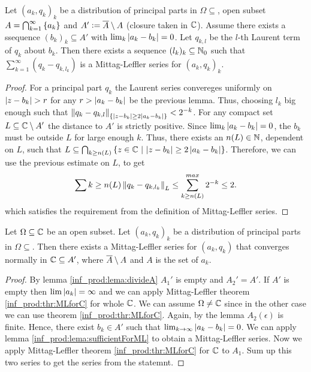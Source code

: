 \begin{lema}
    \label{inf_prod:lema:sufficientForML}
    Let $(a_k, q_k)_k$ be a distribution of principal parts in $\Omega \subseteq$, open subset $A = \bigcap_{k = 1}^{\infty} \left\{a_k\right\}$ and $A' \vcentcolon= \overline{A} \setminus A$ (closure taken in $\mathbb{C}$). Assume there exists a ssequence $(b_k)_k \subseteq A'$ with $\lim_k \left\lvert a_k - b_k\right\rvert = 0$. Let $q_{k, l}$ be the $l$-th Laurent term of $q_k$ about $b_k$. Then there exists a sequence $(l_k)_k \subseteq \mathbb{N}_0$ such that $\sum_{k = 1}^{\infty}(q_k - q_{k, l_k})$ is a Mittag-Leffler series for $(a_k, q_k)_k$.
\end{lema}
\begin{proof}
    For a principal part $q_k$ the Laurent series convereges uniformly on $\left\lvert z - b_k\right\rvert > r$ for any $r > \left\lvert a_k - b_k\right\rvert$ be the previous lemma. Thus, choosing $l_k$ big enough such that $\left\lVert q_k - q_{k, l}\right\rVert_{\left\{\left\lvert z - b_k\right\rvert \geq 2 \left\lvert a_k - b_k\right\rvert\right\}} < 2^{-k}$.
    For any compact set $L \subseteq \mathbb{C} \setminus A'$ the distance to $A'$ is strictly positive. Since $\lim_k \left\lvert a_k - b_k\right\rvert = 0$, the $b_k$ must be outside $L$ for large enough $k$. Thus, there exists an $n(L) \in \mathbb{N}$, dependent on $L$, such that $L \subseteq \bigcap_{k \geq n(L)} \left\{z \in \mathbb{C}~\middle\vert~\left\lvert z - b_k\right\rvert \geq 2 \left\lvert a_k - b_k\right\rvert\right\}$. Therefore, we can use the previous estimate on $L$, to get 
    $$
        \sum{k \geq n(L)} \left\lVert q_k - q_{k, l_k}\right\rVert_L \leq \sum_{k \geq n(L)}^{max} 2^{- k} \leq 2.
    $$
    which satisfies the requirement from the definition of Mittag-Leffler series.
\end{proof}

\begin{izrek}
    \label{inf_prod:lema:MLTOpen}
    Let $\Omega \subseteq \mathbb{C}$ be an open subset. Let $(a_k, q_k)_k$ be a distribution of principal parts in $\Omega \subseteq$. Then there exists a Mittag-Leffler series for $(a_k, q_k)$ that converges normally in $\mathbb{C} \subseteq A'$, where $\overline{A} \setminus A$ and $A$ is the set of $a_k$.
\end{izrek}
\begin{proof}
    By lemma \ref{inf_prod:lema:divideA} $A_1'$ is empty and $A_2' = A'$. If $A'$ is empty then $\lim \left\lvert a_k\right\rvert = \infty$ and we can apply Mittag-Leffler theorem \ref{inf_prod:thr:MLforC} for whole $\mathbb{C}$. We can assume $\Omega \neq \mathbb{C}$ since in the other case we can use theorem \ref{inf_prod:thr:MLforC}. Again, by the lemma $A_2(\epsilon)$ is finite. Hence, there exist $b_k \in A'$ such that $\lim_{k \rightarrow \infty} \left\lvert a_k - b_k\right\rvert = 0$. We can apply lemma \ref{inf_prod:lema:sufficientForML} to obtain a Mittag-Leffler series. Now we apply Mittag-Leffler theorem \ref{inf_prod:thr:MLforC} for $\mathbb{C}$ to $A_1$. Sum up this two series to get the series from the statemnt.
\end{proof}

